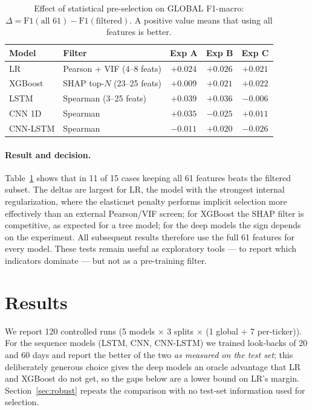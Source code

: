 \documentclass[runningheads]{llncs}
\begin{document}
\begin{table}[htbp]
\centering
\caption{Effect of statistical pre-selection on GLOBAL F1-macro: $\Delta = \text{F1}(\text{all 61}) - \text{F1}(\text{filtered})$. A positive value means that using all features is better.}
\label{tab:featselect}
\begin{tabular}{llccc}
\toprule
Model & Filter & Exp A & Exp B & Exp C \\
\midrule
LR & Pearson + VIF (4--8 feats)& $+0.024$ & $+0.026$ & $+0.021$ \\
XGBoost & SHAP top-$N$ (23--25 feats)& $+0.009$ & $+0.021$ & $+0.022$ \\
LSTM & Spearman (3--25 feats)& $+0.039$ & $+0.036$ & $-0.006$ \\
CNN 1D & Spearman & $+0.035$ & $-0.025$ & $+0.011$ \\
CNN-LSTM & Spearman & $-0.011$ & $+0.020$ & $-0.026$ \\
\bottomrule
\end{tabular}
\end{table}

\paragraph{Result and decision.}
Table~\ref{tab:featselect} shows that in 11 of 15 cases keeping all 61 features beats the filtered subset. The deltas are largest for LR, the model with the strongest internal regularization, where the elasticnet penalty performs implicit selection more effectively than an external Pearson/VIF screen; for XGBoost the SHAP filter is competitive, as expected for a tree model; for the deep models the sign depends on the experiment. All subsequent results therefore use the full 61 features for every model. These tests remain useful as exploratory tools --- to report which indicators dominate --- but not as a pre-training filter.

\section{Results}
\label{sec:results}

We report 120 controlled runs (5 models $\times$ 3 splits $\times$ (1 global + 7 per-ticker)). For the sequence models (LSTM, CNN, CNN-LSTM) we trained look-backs of 20 and 60 days and report the better of the two \emph{as measured on the test set}; this deliberately generous choice gives the deep models an oracle advantage that LR and XGBoost do not get, so the gaps below are a lower bound on LR's margin. Section~\ref{sec:robust} repeats the comparison with no test-set information used for selection.
\end{document}
